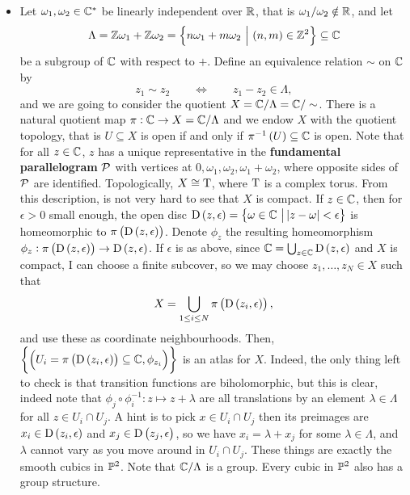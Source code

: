 \begin{example}
\begin{itemize}
\item Let $ \omega_1, \omega_2 \in \mathbb{C}^* $ be linearly independent over $ \mathbb{R} $, that is $ \omega_1 / \omega_2 \notin \mathbb{R} $, and let
$$ \Lambda = \ZZ\omega_1 + \ZZ\omega_2 = \cbr{n\omega_1 + m\omega_2 \st \br{n, m} \in \ZZ^2} \subseteq \CC $$
be a subgroup of $ \mathbb{C} $ with respect to $ + $. Define an equivalence relation $ \sim $ on $ \mathbb{C} $ by
$$ z_1 \sim z_2 \qquad \iff \qquad z_1 - z_2 \in \Lambda, $$
and we are going to consider the quotient $ X = \mathbb{C} / \Lambda = \mathbb{C} / \sim $. There is a natural quotient map $ \pi : \mathbb{C} \to X = \mathbb{C} / \Lambda $ and we endow $ X $ with the quotient topology, that is $ U \subseteq X $ is open if and only if $ \pi^{-1}\br{U} \subseteq \CC $ is open. Note that for all $ z \in \mathbb{C} $, $ z $ has a unique representative in the \textbf{fundamental parallelogram} $ \mathcal{P} $ with vertices at $ 0, \omega_1, \omega_2, \omega_1 + \omega_2 $, where opposite sides of $ \mathcal{P} $ are identified. Topologically, $ X \cong \mathrm{T} $, where $ \mathrm{T} $ is a complex torus. From this description, is not very hard to see that $ X $ is compact. If $ z \in \mathbb{C} $, then for $ \epsilon > 0 $ small enough, the open disc $ \D\br{z, \epsilon} = \cbr{\omega \in \CC \st \abs{z - \omega} < \epsilon} $ is homeomorphic to $ \pi\br{\D\br{z, \epsilon}} $. Denote $ \phi_z $ the resulting homeomorphism $ \phi_z : \pi\br{\D\br{z, \epsilon}} \to \D\br{z, \epsilon} $. If $ \epsilon $ is as above, since $ \CC = \bigcup_{z \in \CC} \D\br{z, \epsilon} $ and $ X $ is compact, I can choose a finite subcover, so we may choose $ z_1, \dots, z_N \in X $ such that
$$ X = \bigcup_{1 \le i \le N} \pi\br{\D\br{z_i, \epsilon}}, $$
and use these as coordinate neighbourhoods. Then, $ \cbr{\br{U_i = \pi\br{\D\br{z_i, \epsilon}} \subseteq \CC, \phi_{z_i}}} $ is an atlas for $ X $. Indeed, the only thing left to check is that transition functions are biholomorphic, but this is clear, indeed note that $ \phi_j \circ \phi_i^{-1} : z \mapsto z + \lambda $ are all translations by an element $ \lambda \in \Lambda $ for all $ z \in U_i \cap U_j $. A hint is to pick $ x \in U_i \cap U_j $ then its preimages are $ x_i \in \D\br{z_i, \epsilon} $ and $ x_j \in \D\br{z_j, \epsilon} $, so we have $ x_i = \lambda + x_j $ for some $ \lambda \in \Lambda $, and $ \lambda $ cannot vary as you move around in $ U_i \cap U_j $. These things are exactly the smooth cubics in $ \mathbb{P}^2 $. Note that $ \mathbb{C} / \Lambda $ is a group. Every cubic in $ \mathbb{P}^2 $ also has a group structure.
\end{itemize}
\end{example}

